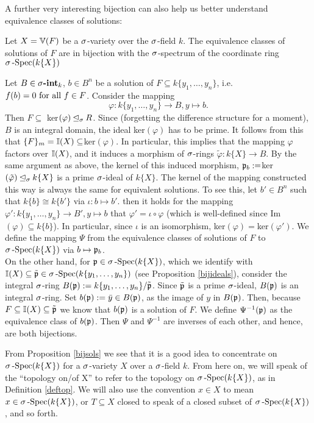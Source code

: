 A further very interesting bijection can also help us better understand equivalence classes of solutions: 
\begin{prop}\label{bijsols}
Let $X = \mathbb{V}(F)$ be a $\sigma$-variety over the $\sigma$-field $k$. The equivalence classes of solutions of $F$ are in bijection with the $\sigma$-spectrum of the coordinate ring $\sigma\operatorname{-Spec}(k\{X\})$
\begin{bew}
Let $B \in \sigma\text{{\normalfont\textbf{-int}}}_k$, $b \in B^n$ be a solution of $F \subseteq k\{y_1,\ldots,y_n\}$, i.e. $f(b) = 0 \text{ for all } f \in F$. Consider the mapping $$\varphi: k\{y_1,\ldots,y_n\} \rightarrow B, y \mapsto b.$$
Then $F \subseteq $ ker$( \varphi) \unlhd_{\sigma} R$.
Since (forgetting the difference structure for a moment), $B$ is an integral domain, the ideal ker$(\varphi)$ has to be prime. It follows from this that $\{F\}_m = \mathbb{I}(X) \subseteq $ker$(\varphi)$. 
In particular, this implies that the mapping $\varphi$ factors over $\mathbb{I}(X)$, and it induces a morphism of $\sigma$-rings $\tilde \varphi: k\{X\} \rightarrow B$. By the same argument as above, the kernel of this induced
morphism, $\mathfrak{p}_b := $ker$(\tilde \varphi) \unlhd_{\sigma} k\{X\}$ is a prime $\sigma$-ideal of $k\{X\}$. The kernel of the mapping constructed this way is always the same for equivalent solutions. To see this, let $b' \in B^n$ such that $k\{b\} \cong k\{b'\}$ via $\iota: b \mapsto b'$.
then it holds for the mapping $\varphi': k\{y_1, \ldots, y_n\} \rightarrow B', y \mapsto b$ that $\varphi' = \iota \circ \varphi$ (which is well-defined since Im$(\varphi)\subseteq k\{b\}$). In particular, since $\iota$ is an isomorphism, ker$(\varphi) = $ker$(\varphi')$. 
We define the mapping $\Psi$ from the equivalence classes of solutions of $F$ to $\sigma\operatorname{-Spec}(k\{X\})$ via $b \mapsto \mathfrak{p}_b$.\\ 

\indent On the other hand, for $\mathfrak{p} \in \sigma\operatorname{-Spec}(k\{X\})$, which we identify with $\mathbb{I}(X) \subseteq \tilde {\mathfrak{p}} \in \sigma\operatorname{-Spec}(k\{y_1,\ldots,y_n\})$ (see Proposition \ref{bijideals}), consider the integral $\sigma$-ring $B(\mathfrak{p}):= k\{y_1,\ldots,y_n\}/ \tilde {\mathfrak{p}}$.
Since $\tilde {\mathfrak{p}}$ is a prime $\sigma$-ideal, $B(\mathfrak{p})$ is an integral $\sigma$-ring. Set $b(\mathfrak{p}) := \bar y \in B(\mathfrak{p})$, as the image of $y$ in $B(\mathfrak{p})$. Then, because $F \subseteq \mathbb{I}(X) \subseteq \tilde {\mathfrak{p}}$ we know that $b(\mathfrak{p})$ is a solution of $F$. 
We define $\Psi^{-1}(\mathfrak{p})$ as the equivalence class of $b(\mathfrak{p})$. Then $\Psi$ and $\Psi^{-1}$ are inverses of each other, and hence, are both bijections.
\end{bew}
\end{prop}

From Proposition \ref{bijsols} we see that it is a good idea to concentrate on $\sigma\operatorname{-Spec}(k\{X\})$ for a $\sigma$-variety $X$ over a $\sigma$-field $k$.
 From here on, we will speak of the ``topology on/of X'' to refer to the topology on $\sigma\operatorname{-Spec}(k\{X\})$, as in Definition \ref{deftop}. 
We will also use the convention $x \in X$ to mean $x \in \sigma\operatorname{-Spec}(k\{X\})$, or $T \subseteq X$ closed to speak of a closed subset of $\sigma\operatorname{-Spec}(k\{X\})$, and so forth.

